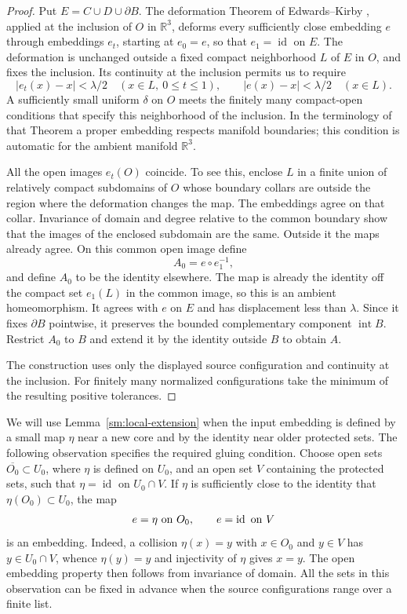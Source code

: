 \documentclass[11pt]{article}
\numberwithin{equation}{section}
\theoremstyle{definition}
\theoremstyle{remark}
\newcommand{\R}{\mathbb R}
\newcommand{\Id}{\operatorname{id}}
\begin{document}
\begin{proof}
Put $E=C\cup D\cup\partial B$.  The deformation Theorem of
Edwards--Kirby \cite[Theorem~5.1]{EdwardsKirby1971}, applied at the
inclusion of $O$ in $\R^3$, deforms every sufficiently close embedding
$e$ through embeddings $e_t$, starting at $e_0=e$, so that
$e_1=\Id$ on $E$.  The deformation is unchanged outside a fixed
compact neighborhood $L$ of $E$ in $O$, and fixes the inclusion.
Its continuity at the inclusion permits us to require
\[
 |e_t(x)-x|<\lambda/2\quad(x\in L,\ 0\le t\le1),
 \qquad |e(x)-x|<\lambda/2\quad(x\in L).
\]
A sufficiently small uniform $\delta$ on $O$ meets the finitely many
compact-open conditions that specify this neighborhood of the
inclusion.  In the terminology of that Theorem a proper embedding
respects manifold boundaries; this condition is automatic for the
ambient manifold $\R^3$.

All the open images $e_t(O)$ coincide.  To see this, enclose $L$ in a
finite union of relatively compact subdomains of $O$ whose boundary collars are outside
the region where the deformation changes the map.  The embeddings
agree on that collar. Invariance of domain
\cite[Theorem~2B.3]{Hatcher2002} and degree relative to
the common boundary show that the images of the enclosed subdomain
are the same.  Outside it the maps already agree.
On this common open image define
\[
 A_0=e\circ e_1^{-1},
\]
and define $A_0$ to be the identity elsewhere.  The map is already
the identity off the compact set $e_1(L)$ in the common image, so
this is an ambient homeomorphism.  It agrees with $e$ on $E$ and has
displacement less than $\lambda$.  Since it fixes $\partial B$
pointwise, it preserves the bounded complementary component
$\operatorname{int}B$.  Restrict $A_0$ to $B$ and extend it by the
identity outside $B$ to obtain $A$.

The construction uses only the displayed source configuration and
continuity at the inclusion.  For finitely many normalized
configurations take the minimum of the resulting positive tolerances.
\end{proof}

We will use Lemma~\ref{sm:local-extension} when the input embedding is
defined by a small map $\eta$ near a new core and by the identity near
older protected sets.  The following observation specifies the required
gluing condition.  Choose open sets
$\overline{O_0}\subset U_0$, where $\eta$ is defined on $U_0$, and
an open set $V$ containing the protected sets, such that
$\eta=\Id$ on $U_0\cap V$.  If $\eta$ is sufficiently close to
the identity that $\eta(O_0)\subset U_0$, the map
\begin{equation}
 \label{sm:patched-embedding}
 e=\eta\ \hbox{on }O_0,\qquad e=\Id\ \hbox{on }V
\end{equation}
is an embedding.  Indeed, a collision $\eta(x)=y$ with
$x\in O_0$ and $y\in V$ has $y\in U_0\cap V$, whence
$\eta(y)=y$ and injectivity of $\eta$ gives $x=y$.  The open
embedding property then follows from invariance of domain.  All the
sets in this observation can be fixed in advance when the source
configurations range over a finite list.
\end{document}
